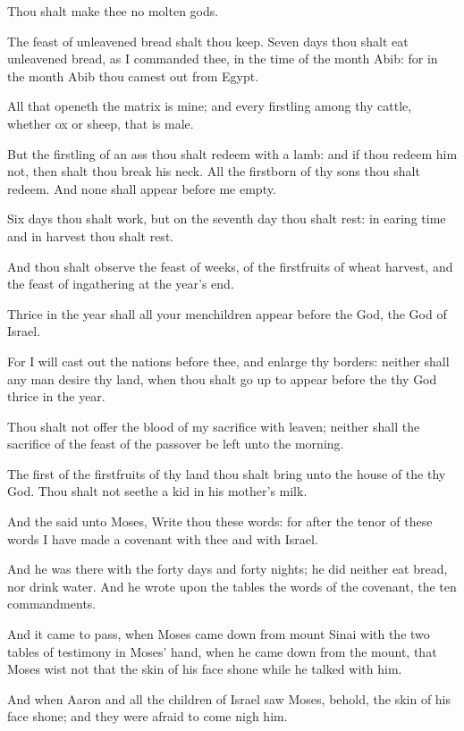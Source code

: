 \Verse Thou shalt make thee no molten gods.

\Verse The feast of unleavened bread shalt thou keep. Seven days thou shalt eat unleavened bread, as I commanded thee, in the time of the month Abib: for in the month Abib thou camest out from Egypt.

\Verse All that openeth the matrix is mine; and every firstling among thy cattle, whether ox or sheep, that is male.

\Verse But the firstling of an ass thou shalt redeem with a lamb: and if thou redeem him not, then shalt thou break his neck. All the firstborn of thy sons thou shalt redeem. And none shall appear before me empty.

\Verse Six days thou shalt work, but on the seventh day thou shalt rest: in earing time and in harvest thou shalt rest.

\Verse And thou shalt observe the feast of weeks, of the firstfruits of wheat harvest, and the feast of ingathering at the year's end.

\Verse Thrice in the year shall all your menchildren appear before the \LORD God, the God of Israel.

\Verse For I will cast out the nations before thee, and enlarge thy borders: neither shall any man desire thy land, when thou shalt go up to appear before the \LORD thy God thrice in the year.

\Verse Thou shalt not offer the blood of my sacrifice with leaven; neither shall the sacrifice of the feast of the passover be left unto the morning.

\Verse The first of the firstfruits of thy land thou shalt bring unto the house of the \LORD thy God. Thou shalt not seethe a kid in his mother's milk.

\Verse And the \LORD said unto Moses, Write thou these words: for after the tenor of these words I have made a covenant with thee and with Israel.

\Verse And he was there with the \LORD forty days and forty nights; he did neither eat bread, nor drink water. And he wrote upon the tables the words of the covenant, the ten commandments.

\Verse And it came to pass, when Moses came down from mount Sinai with the two tables of testimony in Moses' hand, when he came down from the mount, that Moses wist not that the skin of his face shone while he talked with him.

\Verse And when Aaron and all the children of Israel saw Moses, behold, the skin of his face shone; and they were afraid to come nigh him.

